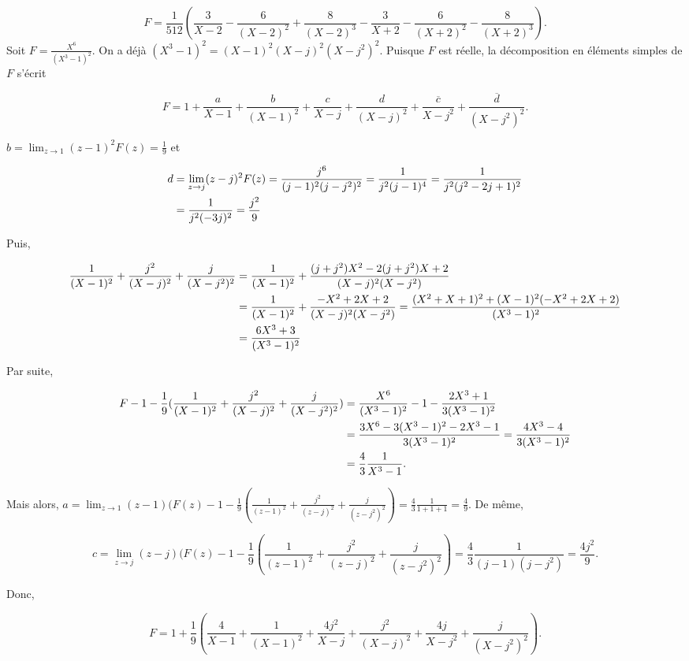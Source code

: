 {{$$F=\frac{1}{512}(\frac{3}{X-2}-\frac{6}{(X-2)^2}+\frac{8}{(X-2)^3}-\frac{3}{X+2}-\frac{6}{(X+2)^2}-\frac{8}{(X+2)^3}).$$
Soit $F=\frac{X^6}{(X^3-1)^2}$. On a déjà $(X^3-1)^2=(X-1)^2(X-j)^2(X-j^2)^2$. Puisque $F$ est réelle, la décomposition en éléments simples de $F$ s'écrit

$$F=1+\frac{a}{X-1}+\frac{b}{(X-1)^2}+\frac{c}{X-j}+\frac{d}{(X-j)^2}+\frac{\overline{c}}{X-j^2}+\frac{\overline{d}}{(X-j^2)^2}.$$

$b=\lim_{z\rightarrow 1}(z-1)^2F(z)=\frac{1}{9}$ et 

\begin{align*}\ensuremath
d&=\lim_{z\rightarrow j}(z-j)^2F(z)=\frac{j^6}{(j-1)^2(j-j^2)^2}=\frac{1}{j^2(j-1)^4}=\frac{1}{j^2(j^2-2j+1)^2}\\
 &= \frac{1}{j^2(-3j)^2}=\frac{j^2}{9}
\end{align*}

Puis,

\begin{align*}\ensuremath
\frac{1}{(X-1)^2}+\frac{j^2}{(X-j)^2}+\frac{j}{(X-j^2)^2}&=\frac{1}{(X-1)^2}+\frac{(j+j^2)X^2-2(j+j^2)X+2}{(X-j)^2(X-j^2)}\\
 &=\frac{1}{(X-1)^2}+\frac{-X^2+2X+2}{(X-j)^2(X-j^2)}=\frac{(X^2+X+1)^2+(X-1)^2(-X^2+2X+2)}{(X^3-1)^2}\\
 &=\frac{6X^3+3}{(X^3-1)^2}
\end{align*}

Par suite,

\begin{align*}\ensuremath
F-1-\frac{1}{9}( \frac{1}{(X-1)^2}+\frac{j^2}{(X-j)^2}+\frac{j}{(X-j^2)^2})&=\frac{X^6}{(X^3-1)^2}-1-\frac{2X^3+1}{3(X^3-1)^2}\\
 &=\frac{3X^6-3(X^3-1)^2-2X^3-1}{3(X^3-1)^2}=\frac{4X^3-4}{3(X^3-1)^2}\\
 &=\frac{4}{3}\frac{1}{X^3-1}.
\end{align*}

Mais alors, $a=\lim_{z\rightarrow 1}(z-1)(F(z)-1-\frac{1}{9}(\frac{1}{(z-1)^2}+\frac{j^2}{(z-j)^2}+\frac{j}{(z-j^2)^2})
=\frac{4}{3}\frac{1}{1+1+1}=\frac{4}{9}$. De même,

$$c=\lim_{z\rightarrow j}(z-j)(F(z)-1-\frac{1}{9}(\frac{1}{(z-1)^2}+\frac{j^2}{(z-j)^2}+\frac{j}{(z-j^2)^2})
=\frac{4}{3}\frac{1}{(j-1)(j-j^2)}=\frac{4j^2}{9}.$$
  
Donc,

$$F=1+\frac{1}{9}(\frac{4}{X-1}+\frac{1}{(X-1)^2}+\frac{4j^2}{X-j}+\frac{j^2}{(X-j)^2}+\frac{4j}{X-j^2}+\frac{j}{(X-j^2)^2}).$$

}}
